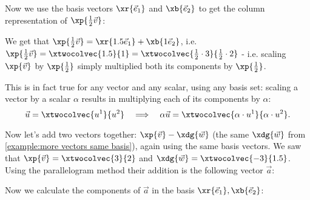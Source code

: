 Now we use the basis vectors $\xr{\vec{e}_{1}}$ and $\xb{\vec{e}_{2}}$ to get the column representation of $\xp{\frac{1}{2}\vec{v}}$:
\begin{center}
\end{center}

We get that $\xp{\frac{1}{2}\vec{v}}=\xr{1.5\vec{e}_{1}}+\xb{1\vec{e}_{2}}$, i.e. $\xp{\frac{1}{2}\vec{v}}=\xtwocolvec{1.5}{1}=\xtwocolvec{\frac{1}{2}\cdot3}{\frac{1}{2}\cdot2}$ - i.e. scaling $\xp{\vec{v}}$ by $\xp{\frac{1}{2}}$ simply multiplied both its components by $\xp{\frac{1}{2}}$.

This is in fact true for any vector and any scalar, using any basis set: scaling a vector by a scalar $\alpha$ results in multiplying each of its components by $\alpha$:
\begin{equation}
  \vec{u} = \xtwocolvec{u^{1}}{u^{2}}\quad\Longrightarrow\quad \alpha\vec{u} = \xtwocolvec{\alpha\cdot u^{1}}{\alpha\cdot u^{2}}.
  \label{eq:column_representation_scaling}
\end{equation}

Now let's add two vectors together: $\xp{\vec{v}}-\xdg{\vec{w}}$ (the same $\xdg{\vec{w}}$ from \autoref{example:more vectors same basis}), again using the same basis vectors. We saw that $\xp{\vec{v}}=\xtwocolvec{3}{2}$ and $\xdg{\vec{w}}=\xtwocolvec{-3}{1.5}$. Using the parallelogram method their addition is the following vector $\vec{a}$:

\begin{center}
\end{center}

Now we calculate the components of $\vec{a}$ in the basis $\xr{\vec{e}_{1}},\xb{\vec{e}_{2}}$:

